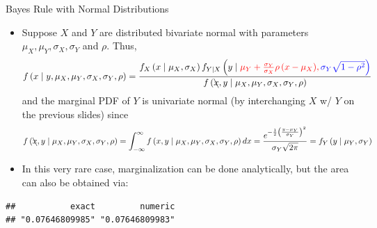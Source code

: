 \documentclass[
  ignorenonframetext,
]{beamer}
\newenvironment{Shaded}{\begin{snugshade}}{\end{snugshade}}
\newcommand{\AttributeTok}[1]{\textcolor[rgb]{0.77,0.63,0.00}{#1}}
\newcommand{\CommentTok}[1]{\textcolor[rgb]{0.56,0.35,0.01}{\textit{#1}}}
\newcommand{\ConstantTok}[1]{\textcolor[rgb]{0.00,0.00,0.00}{#1}}
\newcommand{\DecValTok}[1]{\textcolor[rgb]{0.00,0.00,0.81}{#1}}
\newcommand{\FloatTok}[1]{\textcolor[rgb]{0.00,0.00,0.81}{#1}}
\newcommand{\FunctionTok}[1]{\textcolor[rgb]{0.00,0.00,0.00}{#1}}
\newcommand{\NormalTok}[1]{#1}
\newcommand{\OtherTok}[1]{\textcolor[rgb]{0.56,0.35,0.01}{#1}}
\newcommand{\SpecialCharTok}[1]{\textcolor[rgb]{0.00,0.00,0.00}{#1}}
\providecommand{\tightlist}{%
  \setlength{\itemsep}{0pt}\setlength{\parskip}{0pt}}
\begin{document}
\begin{frame}[fragile]{Bayes Rule with Normal Distributions}
\protect\hypertarget{bayes-rule-with-normal-distributions}{}
\begin{itemize}
\tightlist
\item
  Suppose \(X\) and \(Y\) are distributed bivariate normal with
  parameters \(\mu_X,\mu_Y,\sigma_X,\sigma_Y\) and \(\rho\). Thus,
  \[f\left(x \mid y, \mu_X,\mu_Y,\sigma_X,\sigma_Y, \rho \right) = 
  \frac{f_X\left(x \mid \mu_X, \sigma_X\right) 
  f_{Y\mid X}\left(y \mid \color{red}{\mu_Y + \frac{\sigma_Y}{\sigma_X}\rho\left(x-\mu_X\right)}, 
  \color{blue}{\sigma_Y\sqrt{1 - \rho^2}}\right)}
  {f\left(\bcancel{x}, y \mid\mu_X,\mu_Y,\sigma_X,\sigma_Y,\rho\right)}\]
  and the marginal PDF of \(Y\) is univariate normal (by interchanging
  \(X\) w/ \(Y\) on the previous slides) since
  \[f\left(\bcancel{x}, y \mid\mu_X,\mu_Y,\sigma_X,\sigma_Y,\rho\right) =
  \int_{-\infty}^\infty f\left(x, y \mid\mu_X,\mu_Y,\sigma_X,\sigma_Y,\rho\right) dx =
  \frac{e^{-\frac{1}{2}\left(\frac{y - \mu_Y}{\sigma_Y}\right)^2}}{\sigma_Y \sqrt{2 \pi}} = 
  f_Y\left(y \mid \mu_Y, \sigma_Y\right)\]
\item
  In this very rare case, marginalization can be done analytically, but
  the area can also be obtained via:
\end{itemize}

\begin{Shaded}
\end{Shaded}

\begin{verbatim}
##           exact         numeric 
## "0.07646809985" "0.07646809983"
\end{verbatim}
\end{frame}
\end{document}
